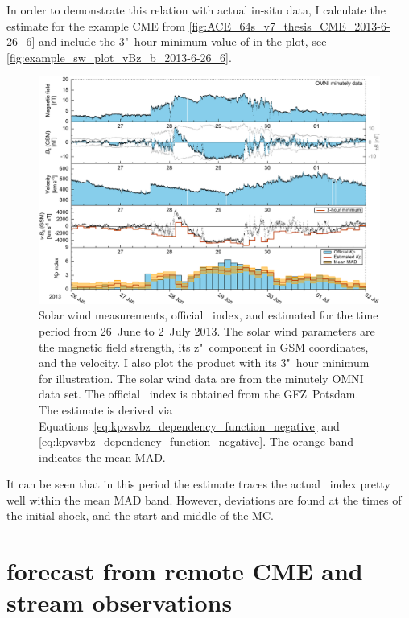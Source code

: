 In order to demonstrate this relation with actual in-situ data, I calculate the \Kp{} estimate for the example CME from \autoref{fig:ACE_64s_v7_thesis_CME_2013-6-26_6} and include the 3"~hour minimum value of \vBz{} in the plot, see \autoref{fig:example_sw_plot_vBz_b_2013-6-26_6}.
\begin{figure}[htb]
	\centering
	\includegraphics[width=\textwidth]{figures_of_mine/chapter2/example_sw_plot_vBz_b_2013-6-26_6.pdf}
	\caption[]
	{Solar wind measurements, official \Kp{}~index, and estimated \Kp{} for the time period from 26~June to 2~July 2013. The solar wind parameters are the magnetic field strength, its z"~component in GSM coordinates, and the velocity. I also plot the product \vBz{} with its 3"~hour minimum for illustration. The solar wind data are from the minutely OMNI data set. The official \Kp{}~index is obtained from the GFZ~Potsdam. The \Kp{} estimate is derived via Equations~\ref{eq:kpvsvbz_dependency_function_negative} and \ref{eq:kpvsvbz_dependency_function_negative}. The orange band indicates the mean MAD.}
	\label{fig:example_sw_plot_vBz_b_2013-6-26_6}
\end{figure}
It can be seen that in this period the \Kp{} estimate traces the actual \Kp{}~index pretty well within the mean MAD band. However, deviations are found at the times of the initial shock, and the start and middle of the MC.\\



\section{\Kp{} forecast from remote CME and stream observations}
\label{sec:kp_forecast_from_remote_CME_and_stream_observations}

